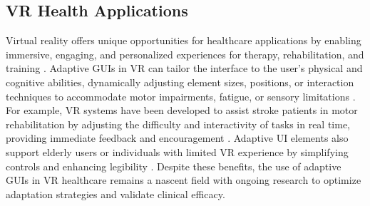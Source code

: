 \documentclass[openany]{book}
\begin{document}

\subsection{VR Health Applications}
Virtual reality offers unique opportunities for healthcare applications by enabling immersive, engaging, and personalized experiences for therapy, rehabilitation, and training \cite{Rizzo2017VRHealthcare}. Adaptive GUIs in VR can tailor the interface to the user’s physical and cognitive abilities, dynamically adjusting element sizes, positions, or interaction techniques to accommodate motor impairments, fatigue, or sensory limitations \cite{Freeman2020AdaptiveVR}.  
For example, VR systems have been developed to assist stroke patients in motor rehabilitation by adjusting the difficulty and interactivity of tasks in real time, providing immediate feedback and encouragement \cite{Laver2017VRStroke}. Adaptive UI elements also support elderly users or individuals with limited VR experience by simplifying controls and enhancing legibility \cite{Slater2020Usability}.  
Despite these benefits, the use of adaptive GUIs in VR healthcare remains a nascent field with ongoing research to optimize adaptation strategies and validate clinical efficacy.
     
\end{document}
